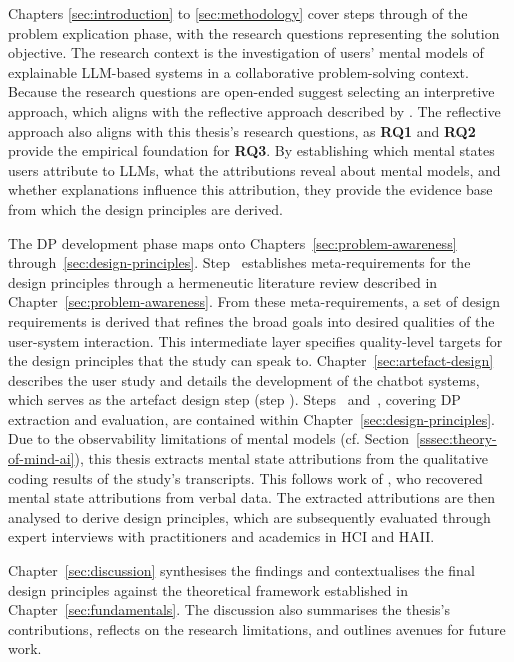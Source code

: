 Chapters \ref{sec:introduction} to \ref{sec:methodology} cover steps  through  of the problem explication phase, with the research questions representing the solution objective. The research context is the investigation of users' mental models of explainable \ac{LLM}-based systems in a collaborative problem-solving context.  Because the research questions are open-ended \textcite{Venable2017} suggest selecting an interpretive approach, which aligns with the reflective approach described by \textcite{Moeller2020}. The reflective approach also aligns with this thesis's research questions, as \textbf{RQ1} and \textbf{RQ2} provide the empirical foundation for \textbf{RQ3}. By establishing which mental states users attribute to \acp{LLM}, what the attributions reveal about mental models, and whether explanations influence this attribution, they provide the evidence base from which the design principles are derived.

The \ac{DP} development phase maps onto Chapters~\ref{sec:problem-awareness} through~\ref{sec:design-principles}. Step~ establishes meta-requirements for the design principles through a hermeneutic literature review \parencite{Boell2014} described in Chapter~\ref{sec:problem-awareness}. From these meta-requirements, a set of design requirements is derived that refines the broad goals into desired qualities of the user-system interaction. This intermediate layer specifies quality-level targets for the design principles that the study can speak to. Chapter~\ref{sec:artefact-design} describes the user study and details the development of the chatbot systems, which serves as the artefact design step (step ). Steps~ and~, covering \ac{DP} extraction and evaluation, are contained within Chapter~\ref{sec:design-principles}. Due to the observability limitations of mental models (cf. Section~\ref{sssec:theory-of-mind-ai}), this thesis extracts mental state attributions from the qualitative coding results of the study's transcripts. This follows work of \textcite{deGraaf2019}, who recovered mental state attributions from verbal data. The extracted attributions are then analysed to derive design principles, which are subsequently evaluated through expert interviews with practitioners and academics in \ac{HCI} and \ac{HAII}.

Chapter~\ref{sec:discussion} synthesises the findings and contextualises the final design principles against the theoretical framework established in Chapter~\ref{sec:fundamentals}. The discussion also summarises the thesis's contributions, reflects on the research limitations, and outlines avenues for future work.
